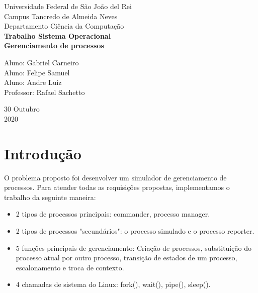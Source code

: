 \documentclass[a4paper, 12pt]{article}
\begin{document}
\begin{titlepage}
	\begin{center}
			\Huge{Universidade Federal de São João del Rei}\\
		\large{Campus Tancredo de Almeida Neves}\\ 
		\large{Departamento Ciência da Computação}\\ 
		\vspace{15pt}
        \vspace{95pt}
        \textbf{\LARGE{Trabalho Sistema Operacional\\Gerenciamento de processos}}\\
		\vspace{3,5cm}
	\end{center}
	
	\begin{flushleft}
		\begin{tabbing}
			Aluno: Gabriel Carneiro \\Aluno: Felipe Samuel\\ Aluno: Andre Luiz \\
			Professor: Rafael Sachetto\\
	\end{tabbing}
 \end{flushleft}
	\vspace{1cm}
	
	\begin{center}
		\vspace{\fill}
			 30 Outubro\\
		 2020
			\end{center}
\end{titlepage}
\newpage
\newpage
\tableofcontents
\thispagestyle{empty}

\newpage
{}
\section{Introdução}
O problema proposto foi desenvolver um simulador de gerenciamento de processos. Para atender todas as requisições propostas, implementamos o trabalho da seguinte maneira:
\begin{itemize}
        \item 2 tipos de processos principais: commander, processo manager.
        \item 2 tipos de processos "secundários": o processo simulado e o processo reporter. 
        \item 5 funções principais de gerenciamento: Criação de processos, substituição do processo atual por outro processo, transição de estados de um processo, escalonamento e troca de contexto.
        \item 4 chamadas de sistema do Linux: fork(), wait(), pipe(), sleep().
        

    \end{itemize}
\end{document}
